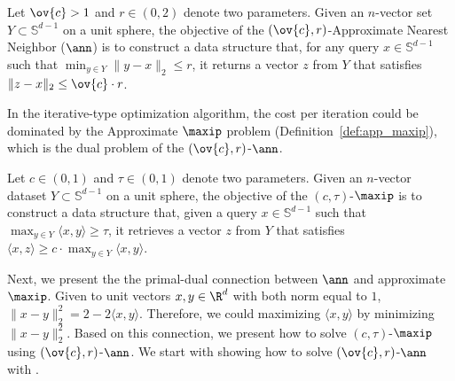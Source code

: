 

\iffalse
\begin{lemma}
A better bound 
\begin{align*}
(1-\epsilon) \cdot \| x \|_2 \leq \| f(x) \|_2 \leq (1+\epsilon) \cdot \| x \|_2
\end{align*}
\end{lemma}

What assumptions are we allowed to make
\begin{itemize}
    \item $W$,
    \item $K$
    \item $V$
    \item In practice, for big model $d = 10^4$ vs $s < 2000$, this means $d \geq s$
\end{itemize}
Where do we use ReLU?
\fi


\iffalse
\begin{definition}\label{def:app_nearest_neighbor}
Let $\ov{c} >1$ and $r \in (0,2)$ denote two parameters.  Given an $n$-vector set $Y \subset \mathbb{S}^{d-1}$ on a unit sphere, the objective of the $(\ov{c},r)$-Approximate Nearest Neighbor ($\ann$) is to construct a data structure that, for any query $x \in \mathbb{S}^{d-1}$ such that $\min_{y\in Y}\| y - x \|_2 \leq r$, it returns a vector $z$ from $Y$ that satisfies $\| z - x \|_2 \leq \ov{c} \cdot r$.
\end{definition}

In the iterative-type optimization algorithm, the cost per iteration could be dominated by the Approximate $\maxip$ problem (Definition~\ref{def:app_maxip}), which is the dual problem of the $(\ov{c},r)$-$\ann$.

\begin{definition}\label{def:app_maxip}
Let $c \in (0,1)$ and $\tau \in (0,1)$ denote two parameters.
Given an $n$-vector dataset $Y \subset \mathbb{S}^{d-1}$ on a unit sphere, the objective of the $(c,\tau)$-{$\maxip$} is to construct a data structure that, given a query $x \in \mathbb{S}^{d-1}$ such that $\max_{y\in Y}\langle x , y \rangle \geq \tau$, it retrieves a vector $z$ from $Y$ that satisfies $\langle x , z \rangle \geq c \cdot \max_{y \in Y} \langle x,y \rangle$.
\end{definition}

Next, we present the the primal-dual connection between $\ann$ and approximate $\maxip$. Given to unit vectors $x,y\in \R^d$ with both norm equal to $1$, $\|x-y\|_2^2 = 2 - 2\langle x , y \rangle$. Therefore, we could maximizing  $\langle x , y \rangle$ by minimizing $\|x-y\|_2^2$. Based on this connection, we present how to solve $(c,\tau)$-{$\maxip$} using $(\ov{c},r)$-{$\ann$}.  We start with showing how to solve $(\ov{c},r)$-{$\ann$} with {\lsh}.


